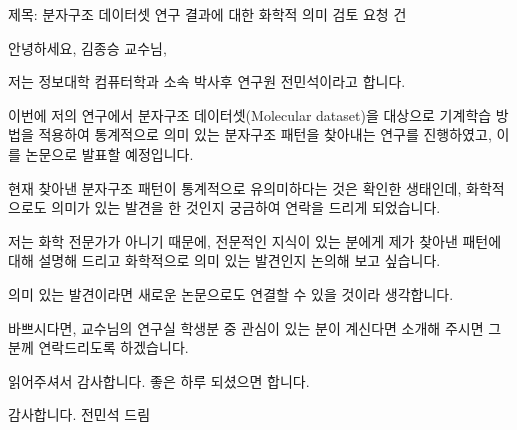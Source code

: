 


제목: 분자구조 데이터셋 연구 결과에 대한 화학적 의미 검토 요청 건


안녕하세요, 김종승 교수님, 

저는 정보대학 컴퓨터학과 소속 박사후 연구원 전민석이라고 합니다.

이번에 저의 연구에서 분자구조 데이터셋(Molecular dataset)을 대상으로 기계학습 방법을 적용하여 통계적으로 의미 있는 분자구조 패턴을 찾아내는 연구를 진행하였고, 이를 논문으로 발표할 예정입니다.

현재 찾아낸 분자구조 패턴이 통계적으로 유의미하다는 것은 확인한 생태인데, 화학적으로도 의미가 있는 발견을 한 것인지 궁금하여 연락을 드리게 되었습니다.

저는 화학 전문가가 아니기 때문에, 전문적인 지식이 있는 분에게 제가 찾아낸 패턴에 대해 설명해 드리고 화학적으로 의미 있는 발견인지 논의해 보고 싶습니다. 

의미 있는 발견이라면 새로운 논문으로도 연결할 수 있을 것이라 생각합니다.

바쁘시다면, 교수님의 연구실 학생분 중 관심이 있는 분이 계신다면 소개해 주시면 그 분께 연락드리도록 하겠습니다.

읽어주셔서 감사합니다. 좋은 하루 되셨으면 합니다.

감사합니다.
전민석 드림







